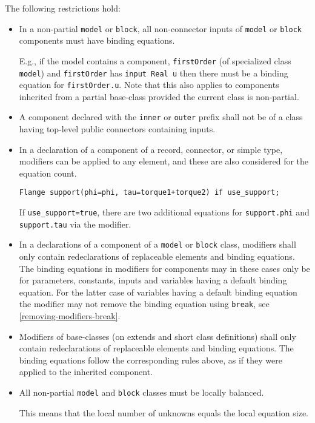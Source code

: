 The following restrictions hold:
\begin{itemize}
\item
  In a non-partial \lstinline!model! or \lstinline!block!, all non-connector inputs of \lstinline!model! or \lstinline!block! components must have binding equations.
  \begin{nonnormative}
  E.g., if the model contains a component, \lstinline!firstOrder! (of specialized class \lstinline!model!) and \lstinline!firstOrder! has
  \lstinline!input Real u! then there must be a binding equation for \lstinline!firstOrder.u!.
  Note that this also applies to components inherited from a partial base-class provided the current class is non-partial.
  \end{nonnormative}
\item
  A component declared with the \lstinline!inner! or \lstinline!outer! prefix shall not be of a
  class having top-level public connectors containing inputs.
\item
  In a declaration of a component of a record, connector, or simple type, modifiers can be applied to any element, and these are also considered for the equation count.
\begin{example}
\begin{lstlisting}[language=modelica]
Flange support(phi=phi, tau=torque1+torque2) if use_support;
\end{lstlisting}
  If \lstinline!use_support=true!, there are two additional equations for \lstinline!support.phi! and \lstinline!support.tau! via the modifier.
\end{example}
\item
  In a declarations of a component of a \lstinline!model! or \lstinline!block! class, modifiers shall only contain redeclarations of replaceable elements and binding equations.
  The binding equations in modifiers for components may in these cases only be for parameters, constants, inputs and variables having a default binding equation.
  For the latter case of variables having a default binding equation the modifier may not remove the binding equation using \lstinline!break!, see \cref{removing-modifiers-break}.
\item
  Modifiers of base-classes (on extends and short class definitions) shall only contain redeclarations of replaceable elements and binding equations.
  The binding equations follow the corresponding rules above, as if they were applied to the inherited component.
\item
  All non-partial \lstinline!model! and \lstinline!block! classes must be locally balanced.
  \begin{nonnormative}
  This means that the local number of unknowns equals the local equation size.
  \end{nonnormative}
\end{itemize}

